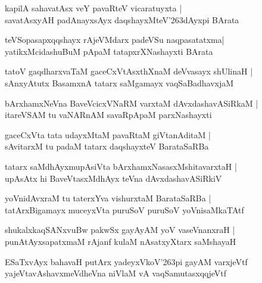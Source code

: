 \documentclass[twoside,12pt,openright]{book}
\def\S{\char'263}
\newcounter{shloka}[chapter]
\begin{document}
\begin{shloka}
kapilA sahavatAsx veY pavaRteV vicaratuyxta |\\
savatAsxyAH padAnayxsAyx daqshayxMteV\S dAyxpi BArata
\end{shloka}

\begin{shloka}
teVSopasapxqqshayx rAjeVMdarx padeVSu naqpasatatxma|\\
yatikxMcidashuBuM pApaM tatapxrXNashayxti BArata
\end{shloka}

\begin{shloka}
tatoV gaqdharxvaTaM gaceCxVtAsxthXnaM deVvasayx shUlinaH |\\
sAnxyAtutx BasamxnA tatarx saMgamayx vaqSaBadhavxjaM 
\end{shloka}

\begin{shloka}
bArxhamxNeVna BaveVcicxVNaRM varxtaM dAvxdashavASiRkaM |\\
itareVSAM tu vaNARnAM savaRpApaM parxNashayxti 
\end{shloka}

\begin{shloka}
gaceCxVta tata udayxMtaM pavaRtaM giVtanAditaM |\\
sAvitarxM tu padaM tatarx daqshayxteV BarataSaRBa 
\end{shloka}

\begin{shloka}
tatarx saMdhAyxmupAsiVta bArxhamxNasasxMshitavarxtaH |\\
upAsAtx hi BaveVtasxMdhAyx teVna dAvxdashavASiRkiV 
\end{shloka}

\begin{shloka}
yoVnidAvxraM tu taterxYva vishurxtaM BarataSaRBa |\\
tatArxBigamayx muceyxVta puruSoV puruSoV yoVnisaMkaTAtf 
\end{shloka}

\begin{shloka}
shukalxkaqSANxvuBw pakwSx gayAyAM yoV vaseVnanxraH |\\
punAtAyxsapatxmaM rAjanf kulaM nAsatxyXtarx saMshayaH 
\end{shloka}

\begin{shloka}
ESaTxvAyx bahavaH putArx yadeyxVkoV\S pi gayAM varxjeVtf 
yajeVtavAshavxmeVdheVna niVlaM vA vaqSamutasxqqjeVtf 
\end{shloka}
\end{document}
